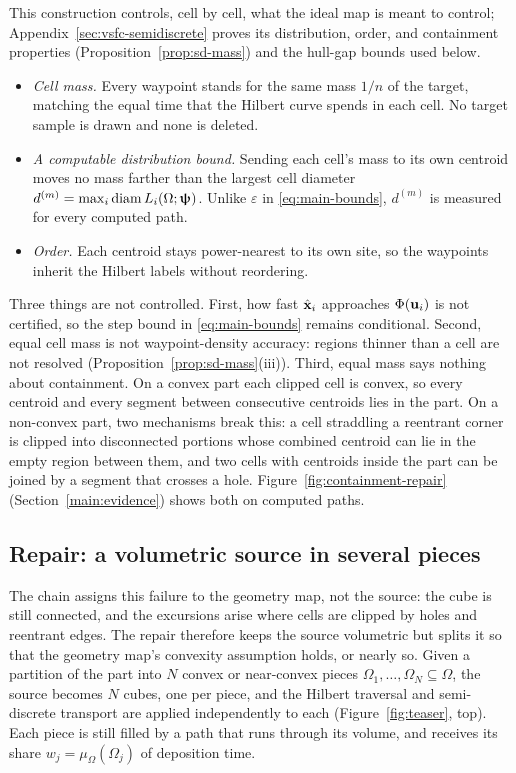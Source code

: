 This construction controls, cell by cell, what the ideal map is meant to control; Appendix~\ref{sec:vsfc-semidiscrete} proves its distribution, order, and containment properties (Proposition~\ref{prop:sd-mass}) and the hull-gap bounds used below.
\begin{itemize}
  \item \emph{Cell mass.} Every waypoint stands for the same mass $1/n$ of the target, matching the equal time that the Hilbert curve spends in each cell. No target sample is drawn and none is deleted.
  \item \emph{A computable distribution bound.} Sending each cell's mass to its own centroid moves no mass farther than the largest cell diameter $d^{(m)}=\max_i\operatorname{diam}L_i(\Omega;{\bm{\mathrm{\uppsi}}})$. Unlike $\varepsilon$ in \eqref{eq:main-bounds}, $d^{(m)}$ is measured for every computed path.
  \item \emph{Order.} Each centroid stays power-nearest to its own site, so the waypoints inherit the Hilbert labels without reordering.
\end{itemize}

Three things are not controlled. First, how fast $\hat {\bm{\mathrm{x}}}_i$ approaches $\Phi({\bm{\mathrm{u}}}_i)$ is not certified, so the step bound in \eqref{eq:main-bounds} remains conditional. Second, equal cell mass is not waypoint-density accuracy: regions thinner than a cell are not resolved (Proposition~\ref{prop:sd-mass}(iii)). Third, equal mass says nothing about containment. On a convex part each clipped cell is convex, so every centroid and every segment between consecutive centroids lies in the part. On a non-convex part, two mechanisms break this: a cell straddling a reentrant corner is clipped into disconnected portions whose combined centroid can lie in the empty region between them, and two cells with centroids inside the part can be joined by a segment that crosses a hole. Figure~\ref{fig:containment-repair} (Section~\ref{main:evidence}) shows both on computed paths.

\subsection{Repair: a volumetric source in several pieces}
\label{main:decomposed}
The chain assigns this failure to the geometry map, not the source: the cube is still connected, and the excursions arise where cells are clipped by holes and reentrant edges. The repair therefore keeps the source volumetric but splits it so that the geometry map's convexity assumption holds, or nearly so. Given a partition of the part into $N$ convex or near-convex pieces $\Omega_1,\dots,\Omega_N\subseteq\Omega$, the source becomes $N$ cubes, one per piece, and the Hilbert traversal and semi-discrete transport are applied independently to each (Figure~\ref{fig:teaser}, top). Each piece is still filled by a path that runs through its volume, and receives its share $w_j=\mu_\Omega(\Omega_j)$ of deposition time.

